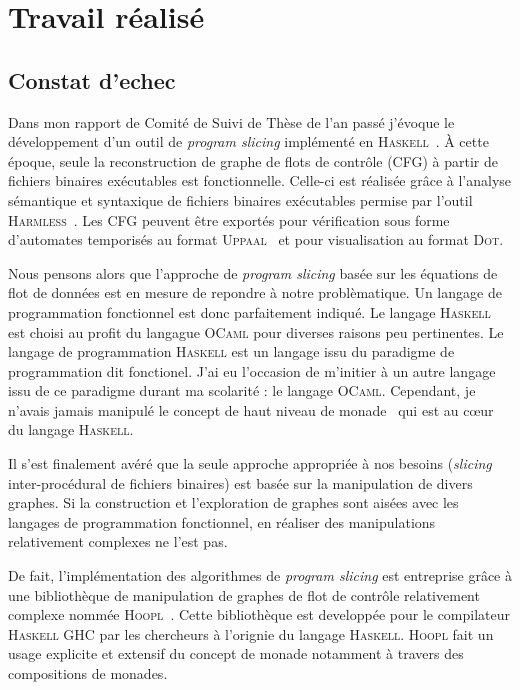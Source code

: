 \section{Travail réalisé}
\label{sec:work}
 
  \subsection{Constat d'echec}

    Dans mon rapport de Comité de Suivi de Thèse de l'an passé j'évoque le
    développement d'un outil de \emph{program slicing} implémenté en
    \textsc{Haskell}~\cite{Mar10}. À cette époque, seule la reconstruction de
    graphe de flots de contrôle (CFG) à partir de fichiers binaires exécutables
    est fonctionnelle. Celle-ci est réalisée grâce à l'analyse sémantique et
    syntaxique de fichiers binaires exécutables permise par l'outil
    \textsc{Harmless}~\cite{KBB12}. Les CFG peuvent être exportés pour
    vérification sous forme d'automates temporisés au format
    \textsc{Uppaal}~\cite{LPY97} et pour visualisation au format \textsc{Dot}.

    Nous pensons alors que l'approche de \emph{program slicing} basée sur les
    équations de flot de données est en mesure de repondre à notre
    problèmatique. Un langage de programmation fonctionnel est donc parfaitement
    indiqué. Le langage \textsc{Haskell} est choisi au profit du langague
    \textsc{OCaml} pour diverses raisons peu pertinentes. Le langage de
    programmation \textsc{Haskell} est un langage issu du paradigme de
    programmation dit fonctionel. J'ai eu l'occasion de m'initier à un autre
    langage issu de ce paradigme durant ma scolarité : le langage
    \textsc{OCaml}. Cependant, je n'avais jamais manipulé le concept de haut
    niveau de \og monade \fg~qui est au c\oe{}ur du langage \textsc{Haskell}.
    
    \medskip
    
    Il s'est finalement avéré que la seule approche appropriée à nos besoins
    (\emph{slicing} inter-procédural de fichiers binaires) est basée sur la
    manipulation de divers graphes. Si la construction et l'exploration de
    graphes sont aisées avec les langages de programmation fonctionnel, en
    réaliser des manipulations relativement complexes ne l'est pas.

    De fait, l'implémentation des algorithmes de \emph{program slicing} est
    entreprise grâce à une bibliothèque de manipulation de graphes de flot de
    contrôle relativement complexe nommée \textsc{Hoopl}~\cite{RDP10}. Cette
    bibliothèque est developpée pour le compilateur \textsc{Haskell}
    \textsc{GHC} par les chercheurs à l'orignie du langage
    \textsc{Haskell}. \textsc{Hoopl} fait un usage explicite et extensif du
    concept de monade notamment à travers des compositions de monades.
    
